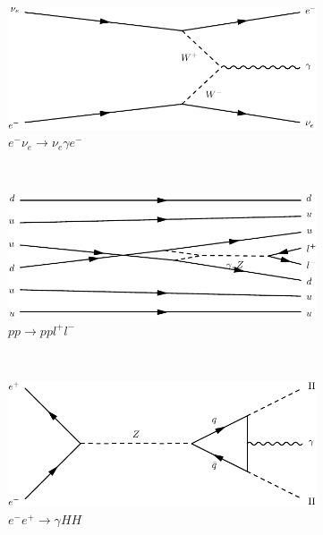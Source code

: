 \begin{figure}[h]
  \newline
  \newline
  \begin{subfigure}[b]{0.3\textwidth}
    \includegraphics[width=\textwidth]{../dia/07.pdf}
    \caption{$e^-\nu_e\rightarrow \nu_e \gamma e^-$}
    \label{fey:7}
  \end{subfigure}%
  ~
  \begin{subfigure}[b]{0.3\textwidth}
    \includegraphics[width=\textwidth]{../dia/08.pdf}
    \caption{$pp\rightarrow ppl^+l^-$}
    \label{fey:8}
  \end{subfigure}%
  ~
  \begin{subfigure}[b]{0.3\textwidth}
    \includegraphics[width=\textwidth]{../dia/09.pdf}
    \caption{$e^-e^+ \rightarrow \gamma HH$}
    \label{fey:9}
  \end{subfigure}
  \newline
  \newline
  \begin{subfigure}[b]{0.3\textwidth}

\end{subfigure}
\end{figure}
